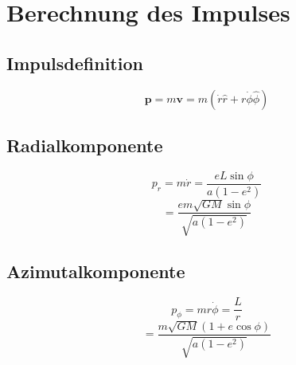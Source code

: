 \section{Berechnung des Impulses}
\subsection{Impulsdefinition}
\[
\mathbf{p} = m \mathbf{v} = m (\dot{r} \hat{r} + r \dot{\phi} \hat{\phi})
\]

\subsection{Radialkomponente}
\[
p_r = m \dot{r} = \frac{e L \sin \phi}{a (1 - e^2)}
\]
\[
= \frac{e m \sqrt{GM} \sin \phi}{\sqrt{a (1 - e^2)}}
\]

\subsection{Azimutalkomponente}
\[
p_\phi = m r \dot{\phi} = \frac{L}{r}
\]
\[
= \frac{m \sqrt{GM} (1 + e \cos \phi)}{\sqrt{a (1 - e^2)}}
\]